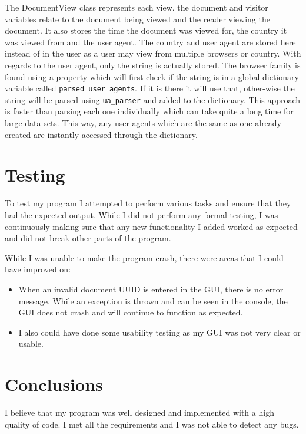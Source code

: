 \documentclass[12pt]{report}
\begin{document}
The DocumentView class represents each view.  the document and visitor variables relate to the document being viewed and the reader viewing the document.  It also stores the time the document was viewed for, the country it was viewed from and the user agent.  The country and user agent are stored here instead of in the user as a user may view from multiple browsers or country.  With regards to the user agent, only the string is actually stored.  The browser family is found using a property which will first check if the string is in a global dictionary variable called \lstinline{parsed_user_agents}\lstinline{}.  If it is there it will use that, other-wise the string will be parsed using \lstinline{ua_parser}\lstinline{} and added to the dictionary.  This approach is faster than parsing each one individually which can take quite a long time for large data sets.  This way, any user agents which are the same as one already created are instantly accessed through the dictionary.  



\chapter{Testing}

To test my program I attempted to perform various tasks and ensure that they had the expected output.  While I did not perform any formal testing, I was continuously making sure that any new functionality I added worked as expected and did not break other parts of the program.

While I was unable to make the program crash, there were areas that I could have improved on:
\begin{itemize}
\item{When an invalid document UUID is entered in the GUI, there is no error message.  While an exception is thrown and can be seen in the console, the GUI does not crash and will continue to function as expected.}
\item{I also could have done some usability testing as my GUI was not very clear or usable.}
\end{itemize}


\chapter{Conclusions}
I believe that my program was well designed and implemented with a high quality of code.  I met all the requirements and I was not able to detect any bugs.
\end{document}
